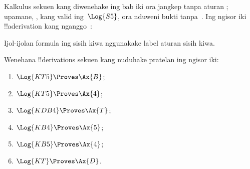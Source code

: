 \documentclass[../../../include/open-logic-section]{subfiles}
\begin{document}
\begin{ex}
Kalkulus sekuen  kang diwenehake ing bab iki ora jangkep tanpa aturan \Cut{};
upamane, , kang valid ing~$\Log{S5}$, ora nduweni bukti
tanpa~\Cut. Ing ngisor iki !!a{derivation} kang nganggo~\Cut:
\begin{prooftree}
\end{prooftree}
Ijol-ijolan formula ing sisih kiwa nggunakake label aturan sisih kiwa.
\end{ex}

\begin{prob}
Wenehana !!{derivation}s sekuen kang nuduhake pratelan ing ngisor iki:
  \begin{enumerate}
  \item $\Log{KT5} \Proves \Ax{B}$;
  \item $\Log{KT5} \Proves \Ax{4}$;
  \item $\Log{KDB4} \Proves \Ax{T}$;
  \item $\Log{KB4} \Proves \Ax{5}$;
  \item $\Log{KB5} \Proves \Ax{4}$;
  \item $\Log{KT} \Proves \Ax{D}$.
  \end{enumerate}
\end{prob}
\end{document}
